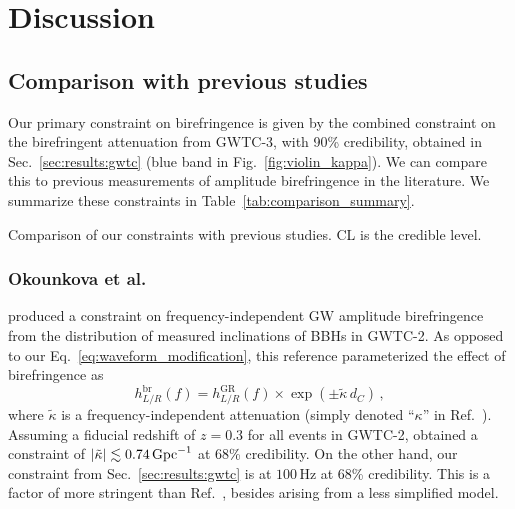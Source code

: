 \documentclass[aps,prd,twocolumn,superscriptaddress,preprintnumbers,nofootinbib]{revtex4-2}
\begin{document}
\section{Discussion}
\label{sec:Discussion}

\subsection{Comparison with previous studies}

Our primary constraint on birefringence is given by the combined constraint on the birefringent attenuation from GWTC-3, with 90\% credibility, obtained in Sec.~\ref{sec:results:gwtc} (blue band in Fig.~\ref{fig:violin_kappa}).
We can compare this to previous measurements of amplitude birefringence in the literature.
We summarize these constraints in Table~\ref{tab:comparison_summary}.

\begin{table}
    \caption{
        Comparison of our constraints with previous studies.
        CL is the credible level.
    }
    \begin{ruledtabular}
    \end{ruledtabular}
    \label{tab:comparison_summary}
\end{table}


\subsubsection{Okounkova et al.}
\citet{Okounkova_2022} produced a constraint on frequency-independent \ac{GW} amplitude birefringence from the distribution of measured inclinations of \acp{BBH} in GWTC-2.
As opposed to our Eq.~\eqref{eq:waveform_modification}, this reference parameterized the effect of birefringence as
\begin{equation}
\label{eq:freqindep}
    h_{L/R}^{\mathrm{br}}(f) =
    h_{L/R}^{\mathrm{GR}}(f) \times
    \exp\left(\pm \tilde{\kappa}\, d_C\right)\,,
\end{equation}
where $\tilde{\kappa}$ is a frequency-independent attenuation (simply denoted ``$\kappa$'' in Ref.~\cite{Okounkova_2022}).
Assuming a fiducial redshift of $z=0.3$ for all events in GWTC-2, \citet{Okounkova_2022} obtained a constraint of $|\tilde{\kappa}| \lesssim 0.74\, {\rm Gpc}^{-1}$ at 68\% credibility.
On the other hand, our constraint from Sec.~\ref{sec:results:gwtc} is  at $100 \, \mathrm{Hz}$ at 68\% credibility.
This is a factor of more stringent than Ref.~\cite{Okounkova_2022}, besides arising from a less simplified model.
\end{document}
